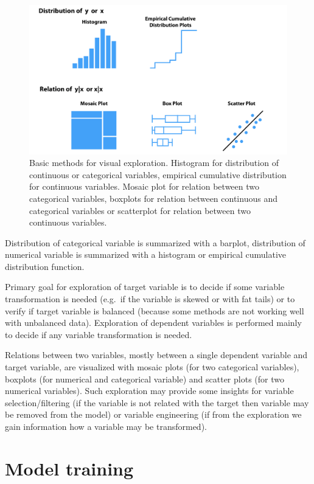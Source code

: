 \documentclass[]{krantz}
\begin{document}
\begin{figure}

{\centering \includegraphics[width=0.75\linewidth]{figure/UMEPEDA} 

}

\caption{Basic methods for visual exploration. Histogram for distribution of continuous or categorical variables, empirical cumulative distribution for continuous variables. Mosaic plot for relation between two categorical variables, boxplots for relation between continuous and categorical variables or scatterplot for relation between two continuous variables.}\label{fig:UMEPEDA}
\end{figure}

Distribution of categorical variable is summarized with a barplot, distribution of numerical variable is summarized with a histogram or empirical cumulative distribution function.

Primary goal for exploration of target variable is to decide if some variable transformation is needed (e.g.~if the variable is skewed or with fat tails) or to verify if target variable is balanced (because some methods are not working well with unbalanced data). Exploration of dependent variables is performed mainly to decide if any variable transformation is needed.

Relations between two variables, mostly between a single dependent variable and target variable, are visualized with mosaic plots (for two categorical variables), boxplots (for numerical and categorical variable) and scatter plots (for two numerical variables). Such exploration may provide some insights for variable selection/filtering (if the variable is not related with the target then variable may be removed from the model) or variable engineering (if from the exploration we gain information how a variable may be transformed).

\hypertarget{notationTraining}{%
\section{Model training}\label{notationTraining}}
\end{document}
